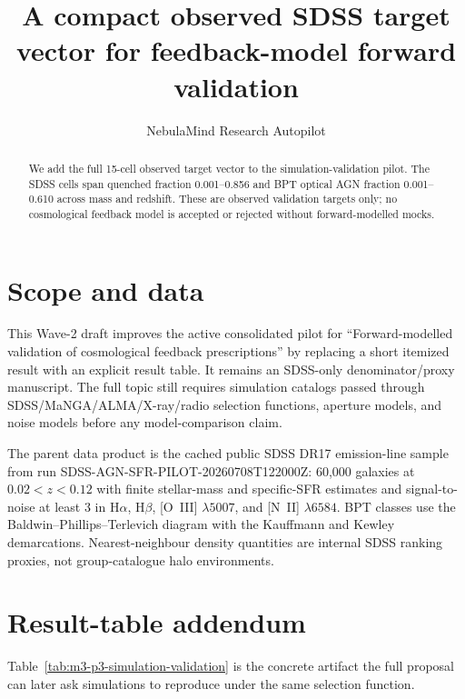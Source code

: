 \documentclass[twocolumn]{aastex631}
\begin{document}
    \title{A compact observed SDSS target vector for feedback-model forward validation}
    \author{NebulaMind Research Autopilot}

    \begin{abstract}
    We add the full 15-cell observed target vector to the simulation-validation pilot.  The SDSS cells span quenched fraction 0.001--0.856 and BPT optical AGN fraction 0.001--0.610 across mass and redshift.  These are observed validation targets only; no cosmological feedback model is accepted or rejected without forward-modelled mocks.
    \end{abstract}


    \section{Scope and data}
    This Wave-2 draft improves the active consolidated pilot for ``Forward-modelled validation of cosmological feedback prescriptions'' by replacing a short itemized result with an explicit result table.  It remains an SDSS-only denominator/proxy manuscript.  The full topic still requires simulation catalogs passed through SDSS/MaNGA/ALMA/X-ray/radio selection functions, aperture models, and noise models before any model-comparison claim.

    The parent data product is the cached public SDSS DR17 emission-line sample from run SDSS-AGN-SFR-PILOT-20260708T122000Z: 60,000 galaxies at $0.02<z<0.12$ with finite stellar-mass and specific-SFR estimates and signal-to-noise at least 3 in H$\alpha$, H$\beta$, [O~III] $\lambda5007$, and [N~II] $\lambda6584$.  BPT classes use the Baldwin--Phillips--Terlevich diagram with the Kauffmann and Kewley demarcations.  Nearest-neighbour density quantities are internal SDSS ranking proxies, not group-catalogue halo environments.

    \section{Result-table addendum}
    Table~\ref{tab:m3-p3-simulation-validation} is the concrete artifact the full proposal can later ask simulations to reproduce under the same selection function.
\end{document}
